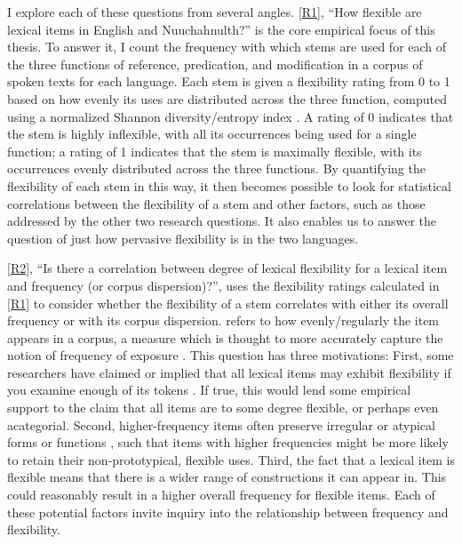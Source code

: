 I explore each of these questions from several angles. \ref{R1}, \enquote{How flexible are lexical items in English and Nuuchahnulth?} is the core empirical focus of this thesis. To answer it, I count the frequency with which stems are used for each of the three functions of reference, predication, and modification in a corpus of spoken texts for each language. Each stem is given a flexibility rating from 0 to 1 based on how evenly its uses are distributed across the three function, computed using a normalized Shannon diversity/entropy index \parencite{Shannon1948}. A rating of 0 indicates that the stem is highly inflexible, with all its occurrences being used for a single function; a rating of 1 indicates that the stem is maximally flexible, with its occurrences evenly distributed across the three functions. By quantifying the flexibility of each stem in this way, it then becomes possible to look for statistical correlations between the flexibility of a stem and other factors, such as those addressed by the other two research questions. It also enables us to answer the question of just how pervasive flexibility is in the two languages.

\ref{R2}, \enquote{Is there a correlation between degree of lexical flexibility for a lexical item and frequency (or corpus dispersion)?}, uses the flexibility ratings calculated in \ref{R1} to consider whether the flexibility of a stem correlates with either its overall frequency or with its corpus dispersion.  refers to how evenly/regularly the item appears in a corpus, a measure which is thought to more accurately capture the notion of frequency of exposure \parencites{Gries2008}{Griesfc}. This question has three motivations: First, some researchers have claimed or implied that all lexical items may exhibit flexibility if you examine enough of its tokens \parencite[77]{MoselHovdhaugen1992}. If true, this would lend some empirical support to the claim that all items are to some degree flexible, or perhaps even acategorial. Second, higher-frequency items often preserve irregular or atypical forms or functions \parencite[Ch.~13]{Bybee2007}, such that items with higher frequencies might be more likely to retain their non-prototypical, flexible uses. Third, the fact that a lexical item is flexible means that there is a wider range of constructions it can appear in. This could reasonably result in a higher overall frequency for flexible items. Each of these potential factors invite inquiry into the relationship between frequency and flexibility.

